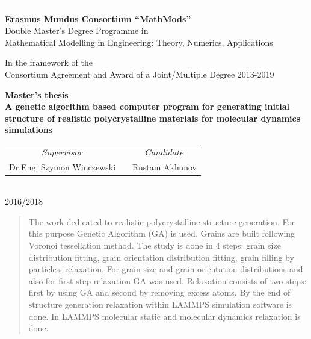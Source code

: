 \documentclass[12pt]{report}
\begin{document}
\begin{center}
    \textcolor{white}{to separate}\\
    \Large{\textbf{Erasmus Mundus Consortium “MathMods”}}\\
    \vspace{10mm}
    \normalsize
    Double Master's Degree Programme in\\
    Mathematical Modelling in Engineering: Theory, Numerics, Applications\\
    \vspace{5mm}
    
    \small{In the framework of the}\\
    \small{Consortium Agreement and Award of a Joint/Multiple Degree 2013-2019}
    \vspace{5mm}
    
    \Large\textbf{Master's thesis}\\
    \Large\textbf{A genetic algorithm based computer program for generating initial structure of realistic polycrystalline materials for molecular dynamics simulations }\\
    \vspace{5mm}
    
    \large
    \begin{tabular}{ccc}
        $Supervisor$ & & $Candidate$\\
        Dr.Eng. Szymon Winczewski  & &  Rustam Akhunov 
    \end{tabular}\\
    
    \vspace{10mm}
    \small
    2016/2018
\end{center}


\author{Rustam Akhunov}


\tableofcontents

\begin{abstract}
The work dedicated to realistic polycrystalline structure generation. For this purpose Genetic Algorithm (GA) is used. Grains are built following Voronoi tessellation method. The study is done in 4 steps: grain size distribution fitting, grain orientation distribution fitting, grain filling by particles, relaxation. For grain size and grain orientation distributions and also for first step relaxation GA was used. Relaxation consists of two steps: first by using GA and second by removing excess atoms. By the end of structure generation relaxation within LAMMPS simulation software is done. In LAMMPS molecular static and molecular dynamics relaxation is done. 
\end{abstract}
\end{document}
